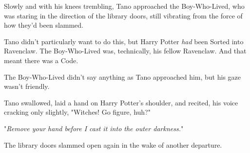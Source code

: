 Slowly and with his knees trembling, Tano approached the Boy-Who-Lived, who was 
staring in the direction of the library doors, still vibrating from the force 
of how they'd been slammed.

Tano didn't particularly want to do this, but Harry Potter \emph{had} been 
Sorted into Ravenclaw. The Boy-Who-Lived was, technically, his fellow 
Ravenclaw. And that meant there was a Code.

The Boy-Who-Lived didn't say anything as Tano approached him, but his gaze 
wasn't friendly.

Tano swallowed, laid a hand on Harry Potter's shoulder, and recited, his voice 
cracking only slightly, "Witches! Go figure, huh?"

"\emph{Remove your hand before I cast it into the outer darkness.}"

The library doors slammed open again in the wake of another departure.